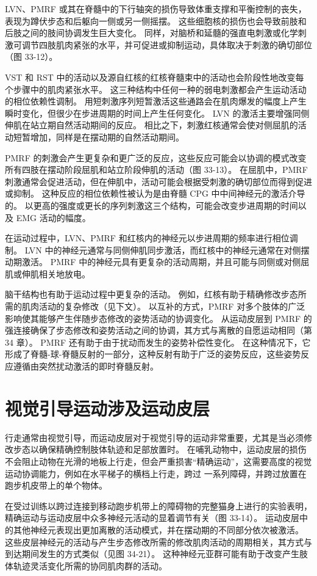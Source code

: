 LVN、PMRF 或其在脊髓中的下行轴突的损伤导致体重支撑和平衡控制的丧失，表现为蹲伏步态和后躯向一侧或另一侧摇摆。 这些细胞核的损伤也会导致前肢和后肢之间的肢间协调发生巨大变化。 同样，对脑桥和延髓的强直电刺激或化学刺激可调节四肢肌肉紧张的水平，并可促进或抑制运动，具体取决于刺激的确切部位（图 33-12）。

VST 和 RST 中的活动以及源自红核的红核脊髓束中的活动也会阶段性地改变每个步骤中的肌肉紧张水平。 这三种结构中任何一种的弱电刺激都会产生运动活动的相位依赖性调制。 用短刺激序列短暂激活这些通路会在肌肉爆发的幅度上产生瞬时变化，但很少在步进周期的时间上产生任何变化。 LVN 的激活主要增强同侧伸肌在站立期自然活动期间的反应。 相比之下，刺激红核通常会使对侧屈肌的活动短暂增加，同样是在摆动期的自然活动期间。

PMRF 的刺激会产生更复杂和更广泛的反应，这些反应可能会以协调的模式改变所有四肢在摆动阶段屈肌和站立阶段伸肌的活动（图 33-13）。 在屈肌中，PMRF 刺激通常会促进活动，但在伸肌中，活动可能会根据受刺激的确切部位而得到促进或抑制。 这种反应的相位依赖性被认为是由脊髓 CPG 中中间神经元的激活介导的。 以更高的强度或更长的序列刺激这三个结构，可能会改变步进周期的时间以及 EMG 活动的幅度。

在运动过程中，LVN、PMRF 和红核内的神经元以步进周期的频率进行相位调制。 LVN 中的神经元通常与同侧伸肌同步激活，而红核中的神经元通常在对侧摆动期激活。 PMRF 中的神经元具有更复杂的活动周期，并且可能与同侧或对侧屈肌或伸肌相关地放电。

脑干结构也有助于运动过程中更复杂的活动。 例如，红核有助于精确修改步态所需的肌肉活动的复杂修改（见下文）。 以互补的方式，PMRF 对多个肢体的广泛影响使其能够产生伴随步态修改的姿势活动的协调变化。 从运动皮层到 PMRF 的强连接确保了步态修改和姿势活动之间的协调，其方式与离散的自愿运动相同（第 34 章）。 PMRF 还有助于由于扰动而发生的姿势补偿性变化。 在这种情况下，它形成了脊髓-球-脊髓反射的一部分，这种反射有助于广泛的姿势反应，这些姿势反应遵循由突然扰动激活的即时脊髓反射。


\section{视觉引导运动涉及运动皮层}

行走通常由视觉引导，而运动皮层对于视觉引导的运动非常重要，尤其是当必须修改步态以确保精确控制肢体轨迹和足部放置时。 在哺乳动物中，运动皮层的损伤不会阻止动物在光滑的地板上行走，但会严重损害“精确运动”，这需要高度的视觉运动协调能力，例如在水平梯子的横档上行走，跨过 一系列障碍，并跨过放置在跑步机皮带上的单个物体。

在受过训练以跨过连接到移动跑步机带上的障碍物的完整猫身上进行的实验表明，精确运动与运动皮层中众多神经元活动的显着调节有关（图 33-14）。 运动皮层中的其他神经元表现出更加离散的活动模式，并在摆动期的不同部分依次被激活。 这些皮层神经元的活动与产生步态修改所需的修改肌肉活动的周期相关，其方式与到达期间发生的方式类似（见图 34-21）。 这种神经元亚群可能有助于改变产生肢体轨迹灵活变化所需的协同肌肉群的活动。

